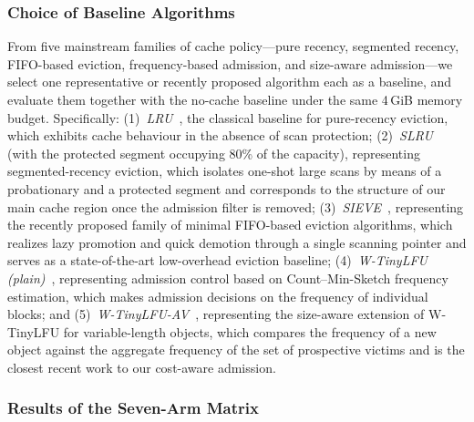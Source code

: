 \subsubsection{Choice of Baseline Algorithms}

From five mainstream families of cache policy---pure recency, segmented
recency, FIFO-based eviction, frequency-based admission, and size-aware
admission---we select one representative or recently proposed algorithm each as
a baseline, and evaluate them together with the no-cache baseline under the same
4\,GiB memory budget. Specifically: (1)~\emph{LRU}~\cite{lru}, the classical
baseline for pure-recency eviction, which exhibits cache behaviour in the
absence of scan protection; (2)~\emph{SLRU}~\cite{slru} (with the protected
segment occupying 80\% of the capacity), representing segmented-recency
eviction, which isolates one-shot large scans by means of a probationary and a
protected segment and corresponds to the structure of our main cache region once
the admission filter is removed; (3)~\emph{SIEVE}~\cite{sieve}, representing the
recently proposed family of minimal FIFO-based eviction algorithms, which
realizes lazy promotion and quick demotion through a single scanning pointer and
serves as a state-of-the-art low-overhead eviction baseline;
(4)~\emph{W-TinyLFU (plain)}~\cite{wtinylfu}, representing admission control
based on Count--Min-Sketch frequency estimation, which makes admission decisions
on the frequency of individual blocks; and (5)~\emph{W-TinyLFU-AV}~\cite{einziger2022av},
representing the size-aware extension of W-TinyLFU for variable-length objects,
which compares the frequency of a new object against the aggregate frequency of
the set of prospective victims and is the closest recent work to our cost-aware
admission.

\subsubsection{Results of the Seven-Arm Matrix}

